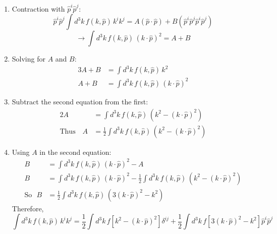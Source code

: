 \begin{enumerate}
\begin{solution}
\begin{enumerate}
                  \item Contraction with $\hat{p}^i \hat{p}^j$:
                        $$\hat{p}^i \hat{p}^j \int d^3 k \, f(k, \hat{p}) \, k^i k^j = A (\hat{p} \cdot \hat{p}) + B (\hat{p}^i \hat{p}^j \hat{p}^i \hat{p}^j)$$
                        $$\rightarrow \int d^3 k \, f(k, \hat{p}) \, (k \cdot \hat{p})^2 = A + B $$
                  \item Solving for $A$ and $B$:
                        \begin{align*}
                            3A + B & = \int d^3 k \, f(k, \hat{p}) \, k^2                 \\
                            A + B  & = \int d^3 k \, f(k, \hat{p}) \, (k \cdot \hat{p})^2
                        \end{align*}
                  \item Subtract the second equation from the first:
                        \begin{align*}
                            2A              & = \int d^3 k \, f(k, \hat{p}) \, (k^2 - (k \cdot \hat{p})^2)             \\
                            \text{Thus~~~}A & = \frac{1}{2} \int d^3 k \, f(k, \hat{p}) \, (k^2 - (k \cdot \hat{p})^2)
                        \end{align*}
                  \item Using $A$ in the second equation:
                        \begin{align*}
                            B            & = \int d^3 k \, f(k, \hat{p}) \, (k \cdot \hat{p})^2 - A                                                                      \\
                            B            & = \int d^3 k \, f(k, \hat{p}) \, (k \cdot \hat{p})^2 - \frac{1}{2} \int d^3 k \, f(k, \hat{p}) \, (k^2 - (k \cdot \hat{p})^2) \\
                            \text{So~~}B & = \frac{1}{2} \int d^3 k \, f(k, \hat{p}) \, (3(k \cdot \hat{p})^2 - k^2)
                        \end{align*}
                        Therefore,
                        $$\int d^3 k \, f(k, \hat{p}) \, k^i k^j = \frac{1}{2} \int d^3 k \, f\left[k^2 - (k \cdot \hat{p})^2\right] \delta^{ij} + \frac{1}{2} \int d^3 k \, f\left[3(k \cdot \hat{p})^2 - k^2\right] \hat{p}^i \hat{p}^j$$
              \end{enumerate}
          \end{solution}
\end{enumerate}
